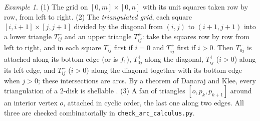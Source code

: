 \documentclass[11pt,reqno]{amsart}
\theoremstyle{definition}
\theoremstyle{remark}
\newtheorem{example}[theorem]{Example}
\numberwithin{equation}{section}
\begin{document}
\begin{example}\label{ex:shellings}
(1) The grid on $[0,m]\times[0,n]$ with its unit squares taken row by row, from left to right.  (2) The
\emph{triangulated grid}, each square $[i,i+1]\times[j,j+1]$ divided by the diagonal from $(i,j)$ to $(i+1,j+1)$
into a lower triangle $T^-_{ij}$ and an upper triangle $T^+_{ij}$: take the squares row by row from left to right,
and in each square $T^-_{ij}$ first if $i=0$ and $T^+_{ij}$ first if $i>0$.  Then $T^-_{0j}$ is attached along its
bottom edge (or is $f_1$), $T^+_{0j}$ along the diagonal, $T^+_{ij}$ ($i>0$) along its left edge, and $T^-_{ij}$ ($i>0$) along
the diagonal together with its bottom edge when $j>0$; these intersections are arcs.  By a theorem of Danaraj and Klee,
every triangulation of a $2$-disk is shellable \cite{DK78}.  (3) A fan of triangles
$[o,p_k,p_{k+1}]$ around an interior vertex $o$, attached in cyclic order, the last one along two edges.  All
three are checked combinatorially in \texttt{check\_arc\_calculus.py}.
\end{example}
\end{document}
